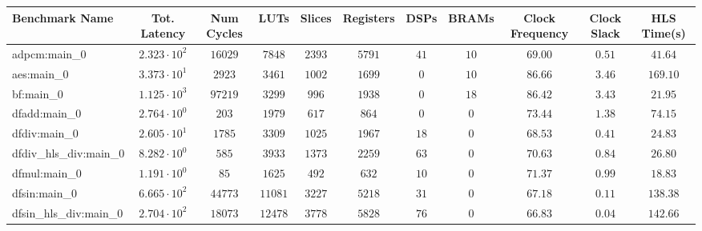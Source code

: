 \begin{tabular}{|l|c|c|c|c|c|c|c|c|c|c|}
\hline
Benchmark Name          & Tot. Latency           & Num Cycles & LUTs      & Slices    & Registers & DSPs    & BRAMs   & Clock Frequency & Clock Slack & HLS Time(s) \\
\hline
adpcm:main\_0           & $ 2.323 \cdot 10^{2} $ & $ 16029  $ & $ 7848  $ & $ 2393  $ & $ 5791  $ & $ 41  $ & $ 10  $ & $ 69.00       $ & $ 0.51    $ & $ 41.64   $ \\
aes:main\_0             & $ 3.373 \cdot 10^{1} $ & $ 2923   $ & $ 3461  $ & $ 1002  $ & $ 1699  $ & $ 0   $ & $ 10  $ & $ 86.66       $ & $ 3.46    $ & $ 169.10  $ \\
bf:main\_0              & $ 1.125 \cdot 10^{3} $ & $ 97219  $ & $ 3299  $ & $ 996   $ & $ 1938  $ & $ 0   $ & $ 18  $ & $ 86.42       $ & $ 3.43    $ & $ 21.95   $ \\
dfadd:main\_0           & $ 2.764 \cdot 10^{0} $ & $ 203    $ & $ 1979  $ & $ 617   $ & $ 864   $ & $ 0   $ & $ 0   $ & $ 73.44       $ & $ 1.38    $ & $ 74.15   $ \\
dfdiv:main\_0           & $ 2.605 \cdot 10^{1} $ & $ 1785   $ & $ 3309  $ & $ 1025  $ & $ 1967  $ & $ 18  $ & $ 0   $ & $ 68.53       $ & $ 0.41    $ & $ 24.83   $ \\
dfdiv\_hls\_div:main\_0 & $ 8.282 \cdot 10^{0} $ & $ 585    $ & $ 3933  $ & $ 1373  $ & $ 2259  $ & $ 63  $ & $ 0   $ & $ 70.63       $ & $ 0.84    $ & $ 26.80   $ \\
dfmul:main\_0           & $ 1.191 \cdot 10^{0} $ & $ 85     $ & $ 1625  $ & $ 492   $ & $ 632   $ & $ 10  $ & $ 0   $ & $ 71.37       $ & $ 0.99    $ & $ 18.83   $ \\
dfsin:main\_0           & $ 6.665 \cdot 10^{2} $ & $ 44773  $ & $ 11081 $ & $ 3227  $ & $ 5218  $ & $ 31  $ & $ 0   $ & $ 67.18       $ & $ 0.11    $ & $ 138.38  $ \\
dfsin\_hls\_div:main\_0 & $ 2.704 \cdot 10^{2} $ & $ 18073  $ & $ 12478 $ & $ 3778  $ & $ 5828  $ & $ 76  $ & $ 0   $ & $ 66.83       $ & $ 0.04    $ & $ 142.66  $ \\

\end{tabular}

